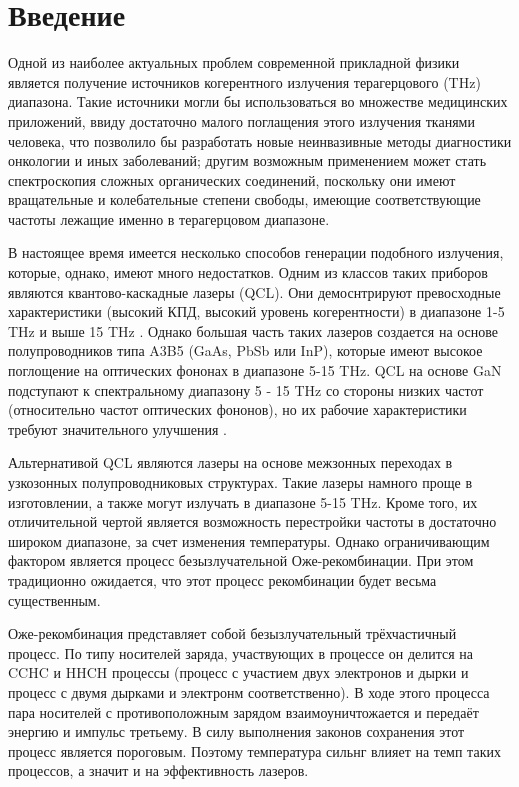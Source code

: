 \documentclass[../main.tex]{subfiles}
\begin{document}
    \chapter{Введение}

Одной из наиболее актуальных проблем современной прикладной физики является
получение источников когерентного излучения терагерцового (THz) диапазона. Такие
источники могли бы использоваться во множестве медицинских приложений, ввиду достаточно 
малого поглащения этого излучения тканями человека, что позволило бы разработать 
новые неинвазивные методы диагностики онкологии и иных заболеваний; другим возможным 
применением может стать спектроскопия сложных органических соединений, поскольку 
они имеют вращательные и колебательные степени свободы, имеющие соответствующие частоты 
лежащие именно в терагерцовом диапазоне.

В настоящее время имеется несколько способов генерации подобного излучения, которые, однако, 
имеют много недостатков. Одним из классов таких приборов являются квантово-каскадные лазеры (QCL).
Они демоснтрируют превосходные характеристики (высокий КПД, высокий уровень когерентности)
в диапазоне 1-5 THz и выше 15 THz \cite{Intro1}. Однако большая часть таких лазеров создается на основе 
полупроводников типа A3B5 (GaAs, PbSb или InP), которые имеют высокое поглощение на оптических 
фононах в диапазоне 5-15 THz. QCL на основе GaN подступают к спектральному диапазону 5 - 15 THz со
стороны низких частот (относительно частот оптических фононов), но их рабочие характеристики 
требуют значительного улучшения \cite{Intro7}.

Альтернативой QCL являются лазеры на основе межзонных переходах в узкозонных полупроводниковых структурах.
Такие лазеры намного проще в изготовлении, а также могут излучать в диапазоне 5-15 THz. Кроме того, их 
отличительной чертой является возможность перестройки частоты в достаточно широком диапазоне, за счет 
изменения температуры. Однако ограничивающим
фактором является процесс безызлучательной Оже-рекомбинации. При этом традиционно ожидается, что этот процесс
рекомбинации будет весьма существенным.

Оже-рекомбинация представляет собой безызлучательный трёхчастичный процесс. По типу носителей заряда, участвующих
в процессе он делится на CCHC и HHCH процессы (процесс с участием двух электронов и дырки и процесс с двумя дырками
и электронм соответственно). В ходе этого процесса пара носителей с противоположным зарядом взаимоуничтожается и
передаёт энергию и импульс третьему. В силу выполнения законов сохранения этот процесс является пороговым.
Поэтому температура сильнг влияет на темп таких процессов, а значит и на эффективность лазеров.
\end{document}
